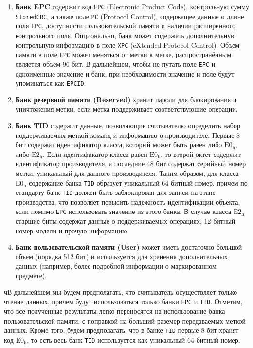 \begin{enumerate}
	\item \textbf{Банк EPC} содержит код \texttt{EPC} (Electronic Product Code), контрольную сумму \texttt{StoredCRC}, а также поле \texttt{PC} (Protocol Control), содержащее данные о длине поля \texttt{EPC}, доступности пользовательской памяти и наличии расширенного контрольного поля. Опционально, банк может содержать дополнительную контрольную информацию в поле \texttt{XPC} (eXtended Protocol Control). Объем памяти в поле \texttt{EPC} может меняться от метки к метке, распространённым является объем 96 бит. В дальнейшем, чтобы не путать поле \texttt{EPC} и одноименные значение и банк, при необходимости значение и поле будут упоминаться как \texttt{EPCID}.
	\item \textbf{Банк резервной памяти (Reserved)} хранит пароли для блокирования и уничтожения метки, если метка поддерживает соответствующие операции.
	\item \textbf{Банк TID} содержит данные, позволяющие считывателю определить набор поддерживаемых меткой команд и информацию о производителе. Первые 8 бит содержат идентификатор класса, который может быть равен либо $\text{E0}_\text{h}$, либо $\text{E2}_\text{h}$. Если идентификатор класса равен $\text{E0}_\text{h}$, то второй октет содержит идентификатор производителя, а последние 48 бит содержат серийный номер метки, уникальный для данного производителя. Таким образом, для класса $\text{E0}_\text{h}$ содержание банка \texttt{TID} образует уникальный 64-битный номер, причем по стандарту банк \texttt{TID} должен быть заблокирован для записи на этапе производства, что позволяет повысить надежность идентификации объекта, если помимо \texttt{EPC} использовать значение из этого банка. В случае класса $\text{E2}_\text{h}$ старшие биты содержат данные о поддерживаемых операциях, 12-битный номер модели и прочую информацию.
	\item \textbf{Банк пользовательской памяти (User)} может иметь достаточно большой объем (порядка 512 бит) и используется для хранения дополнительных данных (например, более подробной информации о маркированном предмете).
\end{enumerate}

чВ дальнейшем мы будем предполагать, что считыватель осуществляет только чтение данных, причем будут использоваться только банки \texttt{EPC} и \texttt{TID}. Отметим, что все полученные результаты легко переносятся на использование банка пользовательской памяти, с поправкой на больший раземер передаваемых меткой данных. Кроме того, будем предполагать, что в банке \texttt{TID} первые 8 бит хранят код $\text{E0}_\text{h}$, то есть весь банк \texttt{TID} используется как уникальный 64-битный номер.



